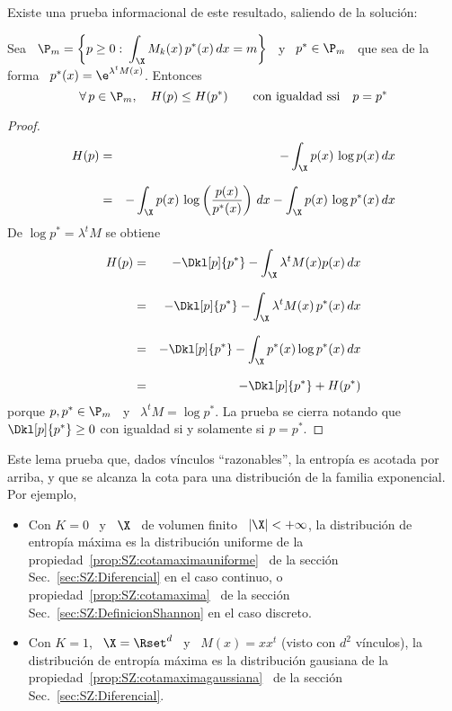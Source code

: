 Existe una prueba informacional de este resultado, saliendo de la soluci\'on:
%
\begin{lema}
  Sea \ $\displaystyle \P_m = \left\{ p \ge 0: \: \int_\X M_k(x) \, p^*(x) \, dx
    =  m \right\}$ \  y \  $p^* \in  \P_m$ \  que sea  de la  forma \  $p^*(x) =
  \e^{\lambda^t M(x)}$. Entonces
  \[
  \forall \,  p \in \P_m, \quad  H(p) \le H(p^*) \qquad  \mbox{con igualdad ssi}
  \quad p = p^*
  \]
\end{lema}
\begin{proof}
  \begin{eqnarray*}
  H(p) & = & - \int_\X p(x) \, \log p(x) \, dx\\[2.5mm]
  & = & - \int_\X p(x) \, \log\left( \frac{p(x)}{p^*(x)} \right) \, dx - \int_\X
  p(x) \, \log p^*(x) \, dx
  \end{eqnarray*}
  De $\log p^* = \lambda^t M$ se obtiene
  \begin{eqnarray*}
  H(p) & = & - \Dkl[p]{p^*} - \int_\X \lambda^t M(x) p(x)
  \, dx\\[2.5mm]
  & = & - \Dkl[p]{p^*} - \int_\X \lambda^t M(x) \, p^*(x) \, dx\\[2.5mm]
  & = & - \Dkl[p]{p^*} - \int_\X p^*(x) \log p^*(x) \, dx\\[2.5mm]
  & = & - \Dkl[p]{p^*} + H(p^*)
  \end{eqnarray*}
  porque $p, p^* \in  \P_m$ \ y \ $\lambda^t M = \log  p^*$. La prueba se cierra
  notando que $\Dkl[p]{p^*} \ge 0$ con igualdad si y solamente si $p = p^*$.
\end{proof}
%
Este lema prueba que, dados  v\'inculos ``razonables'', la entrop\'ia es acotada
por  arriba, y que  se alcanza  la cota  para una  distribuci\'on de  la familia
exponencial. Por ejemplo,
%
\begin{itemize}
\item Con  $K =  0$ \  y \  $\X$ \ de  volumen finito  \ $|\X|  < +  \infty$, la
  distribuci\'on  de entrop\'ia  m\'axima es  la distribuci\'on  uniforme  de la
  propiedad~\ref{prop:SZ:cotamaximauniforme}      \     de      la     secci\'on
  Sec.~\ref{sec:SZ:Diferencial}      en       el      caso      continuo,      o
  propiedad~\ref{prop:SZ:cotamaxima}        \       de        la       secci\'on
  Sec.~\ref{sec:SZ:DefinicionShannon} en el caso discreto.
%
\item Con  $K =  1$, \ $\X  = \Rset^d$  \ y \  $M(x) = x  x^t$ (visto  con $d^2$
  v\'inculos),  la distribuci\'on  de entrop\'ia  m\'axima es  la distribuci\'on
  gausiana de  la propiedad~\ref{prop:SZ:cotamaximagaussiana} \  de la secci\'on
  Sec.~\ref{sec:SZ:Diferencial}.
\end{itemize}


